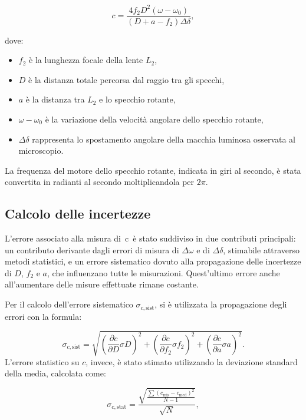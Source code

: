 \documentclass{article}
\begin{document}
\begin{equation}
c = \frac{4 f_2 D^2 (\omega - \omega_0)}{(D + a - f_2) \Delta \delta},
\end{equation}

dove:
\begin{itemize}
    \item $f_2$ è la lunghezza focale della lente \(L_2\),
    \item $D$ è la distanza totale percorsa dal raggio tra gli specchi,
    \item $a$ è la distanza tra \(L_2\) e lo specchio rotante,
    \item  \(\omega - \omega_0\) è la variazione della velocità angolare dello specchio rotante,
    \item $\Delta \delta$ rappresenta lo spostamento angolare della macchia luminosa osservata al microscopio.
\end{itemize}

La frequenza del motore dello specchio rotante, indicata in giri al secondo, è stata convertita in radianti al secondo moltiplicandola per $2 \pi$.


\subsection{Calcolo delle incertezze}

L’errore associato alla misura di c è stato suddiviso in due contributi principali: un contributo derivante dagli errori di misura di \textbf{\(\Delta \omega\)} e di \textbf{\(\Delta \delta\)}, stimabile attraverso metodi statistici, e un errore sistematico dovuto alla propagazione delle incertezze di \(D\), \(f_2\) e \(a\), che influenzano tutte le misurazioni. Quest’ultimo errore anche all’aumentare delle misure effettuate rimane costante.


Per il calcolo dell'errore sistematico $\sigma_{c,\text{sist}}$, si è utilizzata la propagazione degli errori con la formula:

\begin{equation}
\sigma_{c,\text{sist}} = \sqrt{\left(\frac{\partial c}{\partial D} \sigma D\right)^2 + \left(\frac{\partial c}{\partial f_2} \sigma f_2\right)^2 + \left(\frac{\partial c}{\partial a} \sigma a\right)^2}.
\end{equation}
L'errore statistico su $c$, invece, è stato stimato utilizzando la deviazione standard della media, calcolata come:

\begin{equation}
\sigma_{c,\text{stat}} = \frac{\sqrt{\frac{\sum (c_{\text{mis}} - c_{\text{med}})^2}{N-1}}}{\sqrt{N}},
\end{equation}
\end{document}

